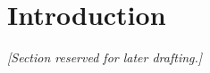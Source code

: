 \section{Introduction}\label{sec:introduction}

\noindent\textit{[Section reserved for later drafting.]}

